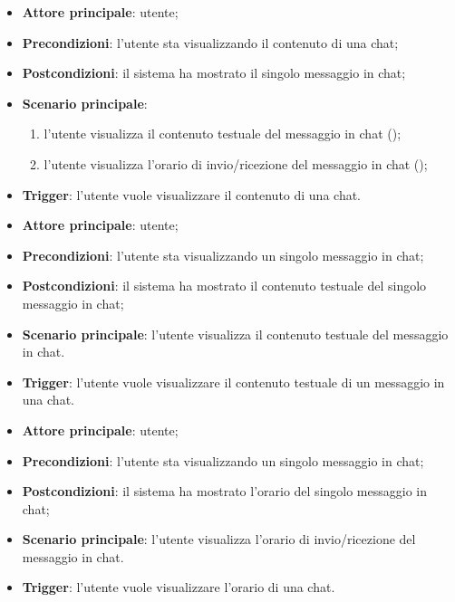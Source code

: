 \documentclass[10pt, a4paper]{article}
\begin{document}
    \begin{itemize}
        \item \textbf{Attore principale}: utente;
        \item \textbf{Precondizioni}: l’utente sta visualizzando il contenuto di una chat;
        \item \textbf{Postcondizioni}: il sistema ha mostrato il singolo messaggio in chat;
        \item \textbf{Scenario principale}:
            \begin{enumerate}
                \item l’utente visualizza il contenuto testuale del messaggio in chat ();
                \item l’utente visualizza l'orario di invio/ricezione del messaggio in chat ();
            \end{enumerate}
        \item \textbf{Trigger}: l’utente vuole visualizzare il contenuto di una chat.
    \end{itemize}

    \begin{itemize}
        \item \textbf{Attore principale}: utente;
        \item \textbf{Precondizioni}: l’utente sta visualizzando un singolo messaggio in chat;
        \item \textbf{Postcondizioni}: il sistema ha mostrato il contenuto testuale del singolo messaggio in chat;
        \item \textbf{Scenario principale}: l’utente visualizza il contenuto testuale del messaggio in chat.
        \item \textbf{Trigger}: l’utente vuole visualizzare il contenuto testuale di un messaggio in una chat.
    \end{itemize}

    \begin{itemize}
        \item \textbf{Attore principale}: utente;
        \item \textbf{Precondizioni}: l’utente sta visualizzando un singolo messaggio in chat;
        \item \textbf{Postcondizioni}: il sistema ha mostrato l'orario del singolo messaggio in chat;
        \item \textbf{Scenario principale}: l’utente visualizza l'orario di invio/ricezione del messaggio in chat.
        \item \textbf{Trigger}: l’utente vuole visualizzare l'orario di una chat.
    \end{itemize}
\end{document}
